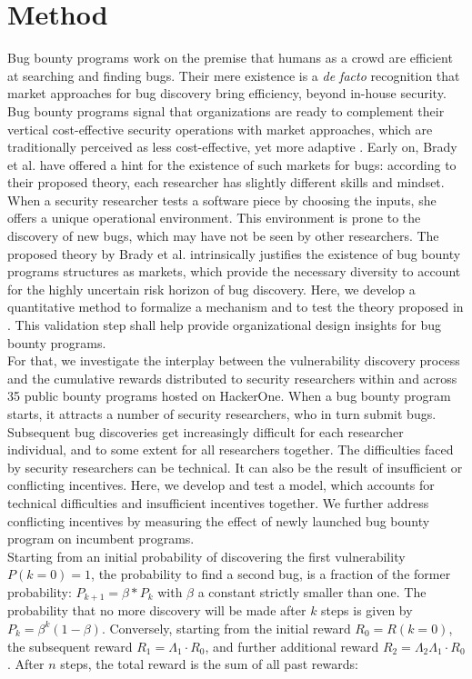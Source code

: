 \section{Method}
\label{sec:method}
Bug bounty programs work on the premise that humans as a crowd are efficient at searching and finding bugs. Their mere existence is a {\it de facto} recognition that market approaches for bug discovery bring efficiency, beyond in-house security. Bug bounty programs signal that organizations are ready to complement their vertical cost-effective security operations with market approaches, which are traditionally perceived as less cost-effective, yet more adaptive \cite{coase1937}. Early on, Brady et al. \cite{brady1999murphy} have offered a hint for the existence of such markets for bugs: according to their proposed theory, each researcher has slightly different skills and mindset. When a security researcher tests a software piece by choosing the inputs, she offers a unique operational environment. This environment is prone to the discovery of new bugs, which may have not be seen by other researchers. The proposed theory by Brady et al. \cite{brady1999murphy} intrinsically justifies the existence of bug bounty programs structures as markets, which provide the necessary diversity to account for the highly uncertain risk horizon of bug discovery. Here, we develop a quantitative method to formalize a mechanism and to test the theory proposed in \cite{brady1999murphy}. This validation step shall help provide organizational design insights for bug bounty programs.\\

For that, we investigate the interplay between the vulnerability discovery process and the cumulative rewards distributed to security researchers within and across 35 public bounty programs hosted on HackerOne. When a bug bounty program starts, it attracts a number of security researchers, who in turn submit bugs. Subsequent bug discoveries get increasingly difficult for each researcher individual, and to some extent for all researchers together. The difficulties faced by security researchers can be technical. It can also be the result of insufficient or conflicting incentives. Here, we develop and test a model, which accounts for technical difficulties and insufficient incentives together. We further address conflicting incentives by measuring the effect of newly launched bug bounty program on incumbent programs.\\

Starting from an initial probability of discovering the first vulnerability $P(k=0) = 1$, the probability to find a second bug, is a fraction of the former probability: $P_{k+1} = \beta * P_k$ with $\beta$ a constant strictly smaller than one. The probability that no more discovery will be made after $k$ steps is given by $P_k = \beta^{k} (1-\beta)$. Conversely, starting from the initial reward $R_0 = R(k=0)$, the subsequent reward $R_1 = \Lambda_1 \cdot R_0$, and further additional reward $ R_2 = \Lambda_2 \Lambda_1 \cdot R_{0}$. After $n$ steps, the total reward is the sum of all past rewards: 

